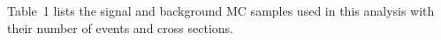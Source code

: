 Table~1
lists the signal and background MC samples used in this analysis with their number of events and cross sections.


